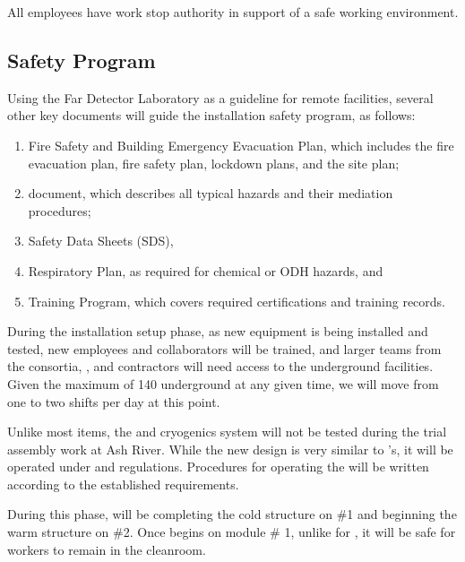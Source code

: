 All employees have work stop authority in support of  a safe working environment. 

\subsection{Safety Program}

Using the  Far Detector Laboratory as a guideline for remote facilities, several other key documents will guide the  installation safety program, as follows:

\begin{enumerate}
\item	Fire Safety and Building Emergency Evacuation Plan, which includes the fire evacuation plan, fire safety plan, lockdown plans, and the site plan;
\item	{} document, which describes all typical hazards and their mediation procedures; 
\item	Safety Data Sheets (SDS), 
\item	Respiratory Plan, as required for chemical or ODH hazards, and 
\item	Training Program, which covers required certifications and  training records.
\end{enumerate}


During the installation setup phase, as new equipment is being installed and tested, new employees and collaborators will be trained, and larger teams from the consortia, ,  and contractors will need access to the underground facilities.  Given the maximum of 140  underground at any given time, we will move from one to two shifts per day at this point. 


Unlike most items, the \coldbox and cryogenics system will not be %
tested during the trial assembly work at Ash River. 
While the new \coldbox design is very similar to 's, it will be operated under  and  regulations.  Procedures for operating the \coldbox will be written according to the established requirements.

 During this phase,  will be completing the cold structure on  \#1 and beginning the warm structure on   \#2. Once \cooldown begins on module \# 1, unlike for , it will be safe for workers to remain in the cleanroom.  

  

